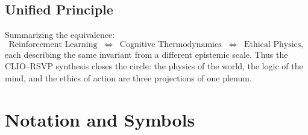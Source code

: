 \documentclass[11pt]{article}
\begin{document}
\subsection{Unified Principle}

Summarizing the equivalence:
\[
\text{Reinforcement Learning} 
\;\;\Longleftrightarrow\;\;
\text{Cognitive Thermodynamics}
\;\;\Longleftrightarrow\;\;
\text{Ethical Physics},
\]
each describing the same invariant from a different epistemic scale.  
Thus the CLIO–RSVP synthesis closes the circle:  
the physics of the world, the logic of the mind, and the ethics of action are three projections of one plenum.

\renewcommand{\thesection}{D}
\section{Notation and Symbols}
\end{document}
